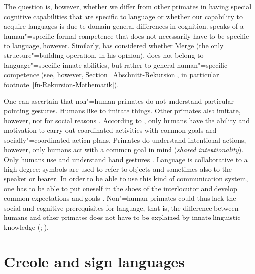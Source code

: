 The question is, however, whether we differ from other primates in having special cognitive
capabilities that are specific to language or whether our capability to acquire languages is due to
domain-general differences in cognition. \citet[Section~2]{Fanselow92b} speaks of a human"=specific formal competence that does not necessarily
have to be specific to language, however. Similarly, \citet[--8]{Chomsky2007a} has considered whether Merge (the only structure"=building
operation, in his opinion), does not belong to language"=specific innate abilities, but rather to general human"=specific competence (see, however,
Section~\ref{Abschnitt-Rekursion}, in particular footnote~\ref{fn-Rekursion-Mathematik}).  

One can ascertain that non"=human primates do not understand particular pointing gestures. Humans like to imitate things. Other primates also imitate, however, not
for social reasons \citep[--10]{Tomasello2006c}. According to \citet[]{TCCBM2005a}, only humans have the ability and motivation to
carry out coordinated activities with common goals and socially"=coordinated action plans. Primates do understand intentional actions, however, only humans
act with a common goal in mind (\emph{shared intentionality}).
Only humans use and understand hand gestures \citep[, 724, 726]{TCCBM2005a}. Language is collaborative to a high degree: symbols
are used to refer to objects and sometimes also to the speaker or hearer. In order to be able to use this kind of communication system, one has to be able to
put oneself in the shoes of the interlocutor and develop common expectations and goals \citep[]{TCCBM2005a}.
Non"=human primates could thus lack the social and cognitive prerequisites for language, that is, the difference between humans and other primates does not have
to be explained by innate linguistic knowledge (\citealp[Section~8.1.2]{Tomasello2003a};
\citealp{TCCBM2005a}).

\section{Creole and sign languages}
\label{sec-creols}

